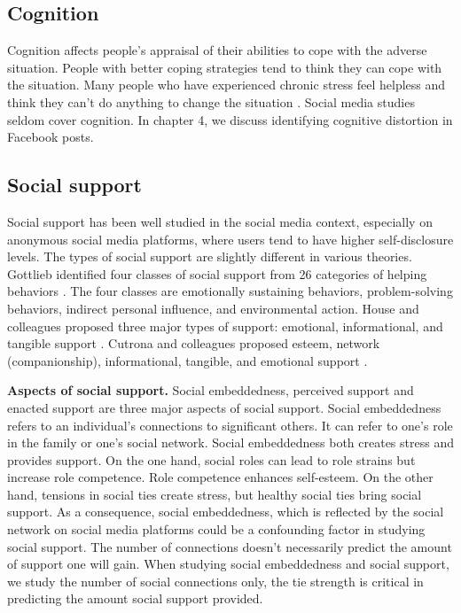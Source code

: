 \subsection{Cognition}
Cognition affects people's appraisal of their abilities to cope with the adverse situation. People with better coping strategies tend to think they can cope with the situation. Many people who have experienced chronic stress feel helpless and think they can't do anything to change the situation \cite{rutter1985resilience}. Social media studies seldom cover cognition. In chapter 4, we discuss identifying cognitive distortion in Facebook posts.

\subsection{Social support}
Social support has been well studied in the social media context, especially on anonymous social media platforms, where users tend to have higher self-disclosure levels. The types of social support are slightly different in various theories. Gottlieb identified four classes of social support from 26 categories of helping behaviors \cite{gottlieb1978development}. The four classes are emotionally sustaining behaviors, problem-solving behaviors, indirect personal influence, and environmental action. House and colleagues proposed three major types of support: emotional, informational, and tangible support \cite{house1985social}. Cutrona and colleagues proposed esteem, network (companionship), informational, tangible, and emotional support \cite{cutrona1990interpersonal}.

\textbf{Aspects of social support.} Social embeddedness, perceived support and enacted support are three major aspects of social support. Social embeddedness refers to an individual's connections to significant others. It can refer to one's role in the family or one's social network. Social embeddedness both creates stress and provides support. On the one hand, social roles can lead to role strains but increase role competence. Role competence enhances self-esteem. On the other hand, tensions in social ties create stress, but healthy social ties bring social support. As a consequence, social embeddedness, which is reflected by the social network on social media platforms could be a confounding factor in studying social support. The number of connections doesn't necessarily predict the amount of support one will gain. When studying social embeddedness and social support, we study the number of social connections only, the tie strength is critical in predicting the amount social support provided.

